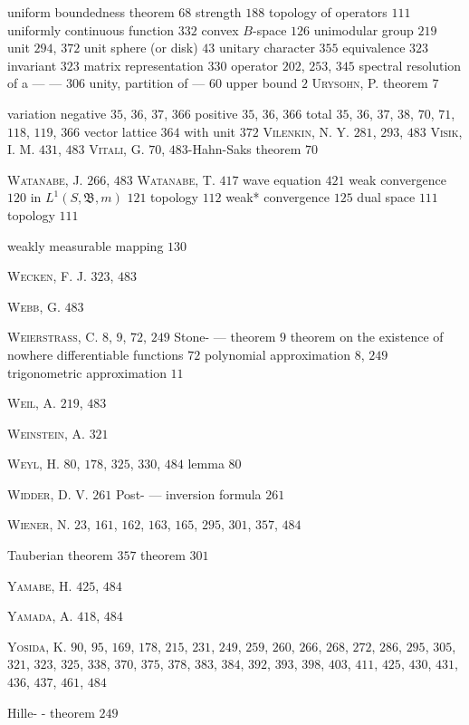 uniform boundedness theorem $68$ strength $188$ topology of operators $111$ uniformly continuous function $332$ convex $B$-space $126$ unimodular group $219$ unit $294$, $372$ unit sphere (or disk) $43$ unitary character $355$ equivalence $323$ invariant $323$ matrix representation $330$ operator $202$, $253$, $345$ spectral resolution of a --- --- $306$ unity, partition of --- $60$ upper bound $2$ \textsc{Urysohn}, P. theorem $7$

variation negative $35$, $36$, $37$, $366$ positive $35$, $36$, $366$ total $35$, $36$, $37$, $38$, $70$, $71$, $118$, $119$, $366$ vector lattice $364$ with unit $372$ \textsc{Vilenkin}, N. Y. $281$, $293$, $483$ \textsc{Visik}, I. M. $431$, $483$ \textsc{Vitali}, G. $70$, $483$-Hahn-Saks theorem $70$

\textsc{Watanabe}, J. $266$, $483$ \textsc{Watanabe}, T. $417$ wave equation $421$ weak convergence $120$ in $L^1(S, \mathfrak{B}, m)$ $121$ topology $112$ weak* convergence $125$ dual space $111$ topology $111$ 

weakly measurable mapping $130$ 

\textsc{Wecken}, F. J. $323$, $483$ 

\textsc{Webb}, G. $483$ 

\textsc{Weierstrass}, C. $8$, $9$, $72$, $249$ Stone- --- theorem $9$ theorem on the existence of nowhere differentiable functions $72$ polynomial approximation $8$, $249$ trigonometric approximation $11$ 

\textsc{Weil}, A. $219$, $483$ 

\textsc{Weinstein}, A. $321$ 

\textsc{Weyl}, H. $80$, $178$, $325$, $330$, $484$ lemma $80$ 

\textsc{Widder}, D. V. $261$ Post- --- inversion formula $261$ 

\textsc{Wiener}, N. $23$, $161$, $162$, $163$, $165$, $295$, $301$, $357$, $484$ 

Tauberian theorem $357$ theorem $301$ 

\textsc{Yamabe}, H. $425$, $484$ 

\textsc{Yamada}, A. $418$, $484$ 

\textsc{Yosida}, K. $90$, $95$, $169$, $178$, $215$, $231$, $249$, $259$, $260$, $266$, $268$, $272$, $286$, $295$, $305$, $321$, $323$, $325$, $338$, $370$, $375$, $378$, $383$, $384$, $392$, $393$, $398$, $403$, $411$, $425$, $430$, $431$, $436$, $437$, $461$, $484$ 

Hille- - theorem $249$ 

